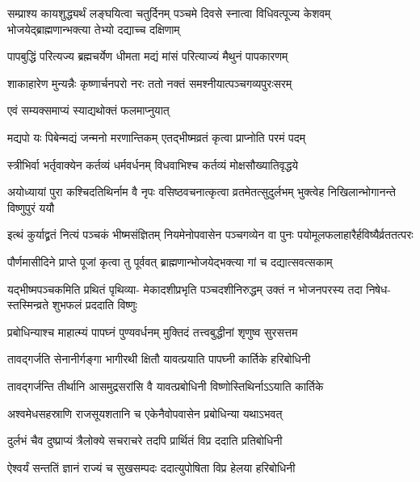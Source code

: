 \threelineshloka
{सम्प्राश्य कायशुद्ध्यर्थं लङ्घयित्वा चतुर्दिनम्}
{पञ्चमे दिवसे स्नात्वा विधिवत्पूज्य केशवम्}
{भोजयेद्ब्राह्मणान्भक्त्या तेभ्यो दद्याच्च दक्षिणाम्} %

\twolineshloka
{पापबुद्धिं परित्यज्य ब्रह्मचर्येण धीमता}
{मद्यं मांसं परित्याज्यं मैथुनं पापकारणम्} %

\twolineshloka
{शाकाहारेण मुन्यन्नैः कृष्णार्चनपरो नरः}
{ततो नक्तं समश्नीयात्पञ्चगव्यपुरःसरम्} %


\onelineshloka
{एवं सम्यक्समाप्यं स्याद्यथोक्तं फलमाप्नुयात्} %

\twolineshloka
{मद्यपो यः पिबेन्मद्यं जन्मनो मरणान्तिकम्}
{एतद्भीष्मव्रतं कृत्वा प्राप्नोति परमं पदम्} %

\twolineshloka
{स्त्रीभिर्वा भर्तृवाक्येन कर्तव्यं धर्मवर्धनम्}
{विधवाभिश्च कर्तव्यं मोक्षसौख्यातिवृद्धये} %

\threelineshloka
{अयोध्यायां पुरा कश्चिदतिथिर्नाम वै नृपः}
{वसिष्ठवचनात्कृत्वा व्रतमेतत्सुदुर्लभम्}
{भुक्त्वेह निखिलान्भोगानन्ते विष्णुपुरं ययौ} %

\threelineshloka
{इत्थं कुर्याद्व्रतं नित्यं पञ्चकं भीष्मसंज्ञितम्}
{नियमेनोपवासेन पञ्चगव्येन वा पुनः}
{पयोमूलफलाहारैर्हविष्यैर्व्रततत्परः} %

\twolineshloka
{पौर्णमासीदिने प्राप्ते पूजां कृत्वा तु पूर्ववत्}
{ब्राह्मणान्भोजयेद्भक्त्या गां च दद्यात्सवत्सकाम्} %

\fourlineindentedshloka
{यद्भीष्मपञ्चकमिति प्रथितं पृथिव्या-}
{मेकादशीप्रभृति पञ्चदशीनिरुद्धम्}
{उक्तं न भोजनपरस्य तदा निषेध-}
{स्तस्मिन्व्रते शुभफलं प्रददाति विष्णुः} %





\twolineshloka
{प्रबोधिन्याश्च माहात्म्यं पापघ्नं पुण्यवर्धनम्}
{मुक्तिदं तत्त्वबुद्धीनां शृणुष्व सुरसत्तम} %

\twolineshloka
{तावद्गर्जति सेनानीर्गङ्गा भागीरथी क्षितौ}
{यावत्प्रयाति पापघ्नी कार्तिके हरिबोधिनी} %

\twolineshloka
{तावद्गर्जन्ति तीर्थानि आसमुद्रसरांसि वै}
{यावत्प्रबोधिनी विष्णोस्तिथिर्नाऽऽयाति कार्तिके} %

\twolineshloka
{अश्वमेधसहस्राणि राजसूयशतानि च}
{एकेनैवोपवासेन प्रबोधिन्या यथाऽभवत्} %

\twolineshloka
{दुर्लभं चैव दुष्प्राप्यं त्रैलोक्ये सचराचरे}
{तदपि प्रार्थितं विप्र ददाति प्रतिबोधिनी} %

\twolineshloka
{ऐश्वर्यं सन्ततिं ज्ञानं राज्यं च सुखसम्पदः}
{ददात्युपोषिता विप्र हेलया हरिबोधिनी} %

